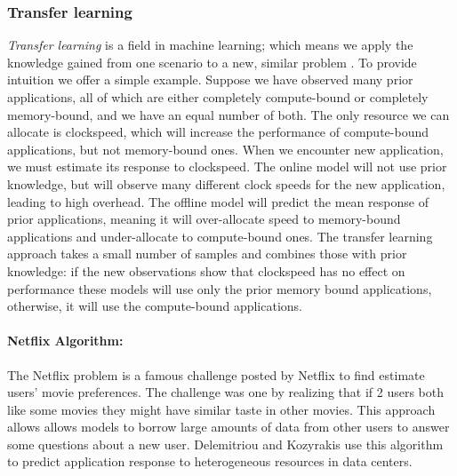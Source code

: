 \subsubsection{Transfer learning}
 \textit{Transfer learning} is a field in machine learning; which
means we apply the knowledge gained from one scenario to a new,
similar problem \cite{pan2010survey}.  To provide intuition we offer a simple example.
Suppose we have observed many prior applications, all of which are
either completely compute-bound or completely memory-bound, and we
have an equal number of both.  The only resource we can allocate is
clockspeed, which will increase the performance of compute-bound
applications, but not memory-bound ones.  When we encounter new
application, we must estimate its response to clockspeed.  The online
model will not use prior knowledge, but will observe many different
clock speeds for the new application, leading to high overhead.  The
offline model will predict the mean response of prior applications,
meaning it will over-allocate speed to memory-bound applications and
under-allocate to compute-bound ones.  The transfer learning approach
takes a small number of samples and combines those with prior
knowledge: if the new observations show that clockspeed has no effect
on performance these models will use only the prior memory bound
applications, otherwise, it will use the compute-bound applications.

\paragraph{Netflix Algorithm:}
The Netflix problem is a famous challenge posted by Netflix to find
estimate users' movie preferences. The challenge was one by realizing
that if 2 users both like some movies they might have similar taste in
other movies. This approach allows allows models to borrow large
amounts of data from other users to answer some questions about a new
user.  
Delemitriou and Kozyrakis use this algorithm to predict application
response to heterogeneous resources in data centers\cite{Paragon}.


